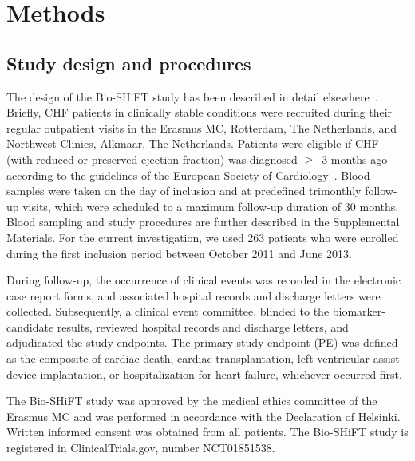 \section{Methods}
\label{c6:sec:methods}

\subsection{Study design and procedures}
The design of the Bio-SHiFT study has been described in detail elsewhere~\citep{van2018toward}. Briefly, CHF patients in clinically stable conditions were recruited during their regular outpatient visits in the Erasmus MC, Rotterdam, The Netherlands, and Northwest Clinics, Alkmaar, The Netherlands. Patients were eligible if CHF (with reduced or preserved ejection fraction) was diagnosed $\geq$~3 months ago according to the guidelines of the European Society of Cardiology~\citep{mcmurray2012v,paulus2007diagnose,dickstein2008stro}. Blood samples were taken on the day of inclusion and at predefined trimonthly follow-up visits, which were scheduled to a maximum follow-up duration of 30 months. Blood sampling and study procedures are further described in the Supplemental Materials. For the current investigation, we used 263 patients who were enrolled during the first inclusion period between October 2011 and June 2013. 

During follow-up, the occurrence of clinical events was recorded in the electronic case report forms, and associated hospital records and discharge letters were collected. Subsequently, a clinical event committee, blinded to the biomarker-candidate results, reviewed hospital records and discharge letters, and adjudicated the study endpoints. The primary study endpoint (PE) was defined as the composite of cardiac death, cardiac transplantation, left ventricular assist device implantation, or hospitalization for heart failure, whichever occurred first.

The Bio-SHiFT study was approved by the medical ethics committee of the Erasmus MC and was performed in accordance with the Declaration of Helsinki. Written informed consent was obtained from all patients. The Bio-SHiFT study is registered in ClinicalTrials.gov, number NCT01851538.

